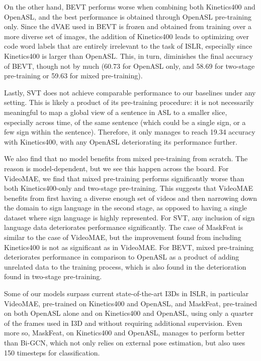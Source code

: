 On the other hand, BEVT performs worse when combining both Kinetics400 and OpenASL, and the best performance is obtained through OpenASL pre-training only. Since the dVAE used in BEVT is frozen and obtained from training over a more diverse set of images, the addition of Kinetics400 leads to optimizing over code word labels that are entirely irrelevant to the task of ISLR, especially since Kinetics400 is larger than OpenASL. This, in turn, diminishes the final accuracy of BEVT, though not by much (60.73 for OpenASL only, and 58.69 for two-stage pre-training or 59.63 for mixed pre-training).

Lastly, SVT does not achieve comparable performance to our baselines under any setting. This is likely a product of its pre-training procedure: it is not necessarily meaningful to map a global view of a sentence in ASL to a smaller slice, especially across time, of the same sentence (which could be a single sign, or a few sign within the sentence). Therefore, it only manages to reach 19.34 accuracy with Kinetics400, with any OpenASL deteriorating its performance further.

We also find that no model benefits from mixed pre-training from scratch. The reason is model-dependent, but we see this happen across the board. For VideoMAE, we find that mixed pre-training performs significantly worse than both Kinetics400-only and two-stage pre-training. This suggests that VideoMAE benefits from first having a diverse enough set of videos and then narrowing down the domain to sign language in the second stage, as opposed to having a single dataset where sign language is highly represented. For SVT, any inclusion of sign language data deteriorates performance significantly. The case of MaskFeat is similar to the case of VideoMAE, but the improvement found from including Kinetics400 is not as significant as in VideoMAE. For BEVT, mixed pre-training deteriorates performance in comparison to OpenASL as a product of adding unrelated data to the training process, which is also found in the deterioration found in two-stage pre-training.

Some of our models surpass current state-of-the-art I3Ds in ISLR, in particular VideoMAE, pre-trained on Kinetics400 and OpenASL, and MaskFeat, pre-trained on both OpenASL alone and on Kinetics400 and OpenASL, using only a quarter of the frames used in I3D and without requiring additional supervision. Even more so, MaskFeat, on Kinetics400 and OpenASL, manages to perform better than Bi-GCN, which not only relies on external pose estimation, but also uses 150 timesteps for classification.

